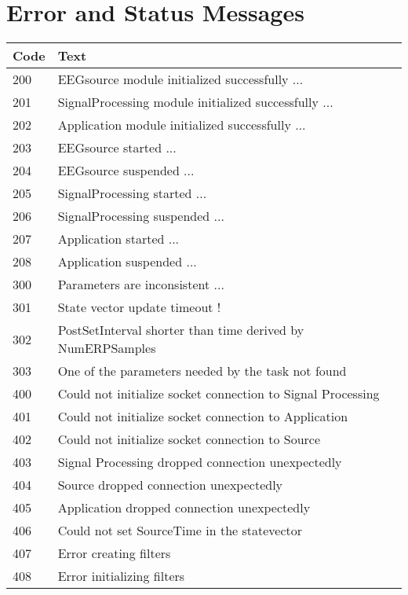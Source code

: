 \chapter{Error and Status Messages}

\begin{table}[ht]
 \begin{tabular}{|l|l|}
  \hline
  \textbf{Code} & \textbf{Text} \\
  \hline
  200 & EEGsource module initialized successfully ... \\
  \hline
  201 & SignalProcessing module initialized successfully ... \\
  \hline
  202 & Application module initialized successfully ... \\
  \hline
  203 & EEGsource started ...\\
  \hline
  204 & EEGsource suspended ...\\
  \hline
  205 & SignalProcessing started ...\\
  \hline
  206 & SignalProcessing suspended ...\\
  \hline
  207 & Application started ...\\
  \hline
  208 & Application suspended ...\\
  \hline
  300 & Parameters are inconsistent ...\\
  \hline
  301 & State vector update timeout ! \\
  \hline
  302 & PostSetInterval shorter than time derived by NumERPSamples \\
  \hline
  303 & One of the parameters needed by the task not found \\
  \hline
  400 & Could not initialize socket connection to Signal Processing \\
  \hline
  401 & Could not initialize socket connection to Application \\
  \hline
  402 & Could not initialize socket connection to Source \\
  \hline
  403 & Signal Processing dropped connection unexpectedly \\
  \hline
  404 & Source dropped connection unexpectedly \\
  \hline
  405 & Application dropped connection unexpectedly \\
  \hline
  406 & Could not set SourceTime in the statevector \\
  \hline
  407 & Error creating filters \\
  \hline
  408 & Error initializing filters \\

\end{tabular}
\end{table}
